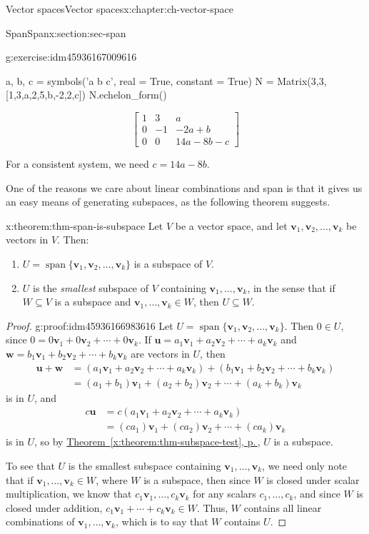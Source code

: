 \documentclass[oneside,10pt,]{book}
\newcommand{\xreffont}{\relax}
\numberwithin{equation}{section}
\newcommand{\spn}{\operatorname{span}}
\newcommand{\bbm}{\begin{bmatrix}}
\newcommand{\ebm}{\end{bmatrix}}
\newcommand{\uu}{\mathbf{u}}
\newcommand{\vv}{\mathbf{v}}
\newcommand{\ww}{\mathbf{w}}
\newcommand{\amp}{&}
\begin{document}
\begin{chapterptx}{Vector spaces}{}{Vector spaces}{}{}{x:chapter:ch-vector-space}
\begin{sectionptx}{Span}{}{Span}{}{}{x:section:sec-span}
\begin{inlineexercise}{}{g:exercise:idm45936167009616}
\begin{sageinput}
a, b, c = symbols('a b c', real = True, constant = True)
N = Matrix(3,3,[1,3,a,2,5,b,-2,2,c])
N.echelon_form()
\end{sageinput}
\begin{sageoutput}
\[\bbm 1\amp 3\amp a\\0\amp -1\amp -2a+b\\0\amp 0\amp 14a-8b-c\ebm\]
\end{sageoutput}
For a consistent system, we need \(c=14a-8b\).%
\end{inlineexercise}%
One of the reasons we care about linear combinations and span is that it gives us an easy means of generating subspaces, as the following theorem suggests.%
\begin{theorem}{}{}{x:theorem:thm-span-is-subspace}%
Let \(V\) be a vector space, and let \(\vv_1,\vv_2,\ldots, \vv_k\) be vectors in \(V\). Then:%
\begin{enumerate}
\item{}\(U=\spn\{\vv_1,\vv_2,\ldots, \vv_k\}\) is a subspace of \(V\).%
\item{}\(U\) is the \emph{smallest} subspace of  \(V\) containing \(\vv_1,\ldots, \vv_k\), in the sense that if \(W\subseteq V\) is a subspace and \(\vv_1,\ldots, \vv_k\in W\), then \(U\subseteq W\).%
\end{enumerate}
%
\end{theorem}
\begin{proof}{}{g:proof:idm45936166983616}
Let \(U=\spn\{\vv_1,\vv_2,\ldots, \vv_k\}\). Then \(0\in U\), since \(0=0\vv_1+0\vv_2+\cdots + 0\vv_k\). If \(\uu=a_1\vv_1+a_2\vv_2+\cdots +a_k\vv_k\) and \(\ww=b_1\vv_1+b_2\vv_2+\cdots +b_k\vv_k\) are vectors in \(U\), then%
\begin{align*}
\uu+\ww \amp =(a_1\vv_1+a_2\vv_2+\cdots +a_k\vv_k)+(b_1\vv_1+b_2\vv_2+\cdots +b_k\vv_k)\\
\amp = (a_1+b_1)\vv_1+(a_2+b_2)\vv_2+\cdots + (a_k+b_k)\vv_k
\end{align*}
is in \(U\), and%
\begin{align*}
c\uu \amp =c(a_1\vv_1+a_2\vv_2+\cdots +a_k\vv_k)\\
\amp =(ca_1)\vv_1+(ca_2)\vv_2+\cdots + (ca_k)\vv_k
\end{align*}
is in \(U\), so by \hyperref[x:theorem:thm-subspace-test]{Theorem~{\xreffont\ref{x:theorem:thm-subspace-test}}, p.\,\pageref{x:theorem:thm-subspace-test}}, \(U\) is a subspace.%
\par
To see that \(U\) is the smallest subspace containing \(\vv_1,\ldots, \vv_k\), we need only note that if \(\vv_1,\ldots, \vv_k\in W\), where \(W\) is a subspace, then since \(W\) is closed under scalar multiplication, we know that \(c_1\vv_1,\ldots, c_k\vv_k\) for any scalars \(c_1,\ldots, c_k\), and since \(W\) is closed under addition, \(c_1\vv_1+\cdots+c_k\vv_k\in W\). Thus, \(W\) contains all linear combinations of \(\vv_1,\ldots, \vv_k\), which is to say that \(W\) contains \(U\).%

\end{proof}
\end{sectionptx}
\end{chapterptx}
\end{document}
